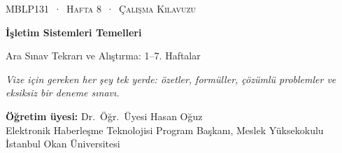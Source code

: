 \setlength{\emergencystretch}{3em}
\newcommand{\gantt}[2]{%
\begin{tikzpicture}[x=#1cm,y=1cm]
\foreach \p/\a/\b in {#2} {
  \fill[col\p] (\a,0) rectangle (\b,0.62);
  \draw[white,line width=1.2pt] (\a,0) -- (\a,0.62);
  \node[font=\small\bfseries,text=txt\p] at ({(\a+\b)/2},0.31) {\p};
  \draw[muted] (\a,0) -- (\a,-0.1) node[below,font=\scriptsize,text=muted,inner sep=1.5pt] {\a};
  \draw[muted] (\b,0) -- (\b,-0.1) node[below,font=\scriptsize,text=muted,inner sep=1.5pt] {\b};
}
\end{tikzpicture}}
\newcommand{\gen}[1]{}
\newcommand{\pts}[1]{\textcolor{mintdeep}{\textbf{[#1~puan]}}\enspace}

\thispagestyle{empty}
\begin{tcolorbox}[enhanced,colback=dark,colframe=dark,arc=0pt,boxrule=0pt,
  left=18pt,right=18pt,top=20pt,bottom=20pt,coltext=white]
{\small\color{mint}\textsc{MBLP131 \,·\, Hafta 8 \,·\, Çalışma Kılavuzu}}\par\medskip
{\headfont\fontsize{26}{30}\selectfont\bfseries İşletim Sistemleri Temelleri}\par\medskip
{\large Ara Sınav Tekrarı ve Alıştırma: 1--7. Haftalar}\par\smallskip
{\small\itshape\color{white!70} Vize için gereken her şey tek yerde: özetler, formüller, çözümlü problemler ve eksiksiz bir deneme sınavı.}
\end{tcolorbox}

\vspace{0.4em}
\begin{minipage}[t]{0.70\linewidth}
\small
\textbf{Öğretim üyesi:} Dr.\ Öğr.\ Üyesi Hasan Oğuz\\
Elektronik Haberleşme Teknolojisi Program Başkanı, Meslek Yüksekokulu\\
İstanbul Okan Üniversitesi
\end{minipage}

